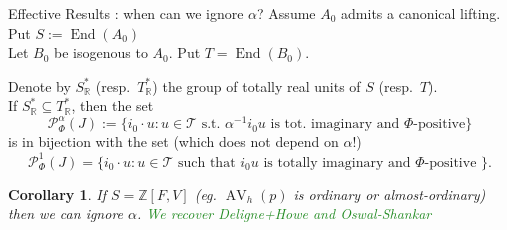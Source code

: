 \documentclass[usenames,dvipsnames,handout]{beamer}
\def\Z{\mathbb{Z}}
\def\R{\mathbb{R}}
\DeclareMathOperator{\AV}{AV}
\DeclareMathOperator{\End}{End}
\newcommand{\Palpha}[2]{\mathcal{P}^{\alpha}_{{#1}}({#2})}
\newcommand{\Pone}[2]{\mathcal{P}^{1}_{{#1}}({#2})}
\newcommand{\green}[1]{\textcolor{ForestGreen}{#1}}
\newtheorem{cor}[df]{Corollary}
\begin{document}
\begin{frame}{ Effective Results : when can we ignore $\alpha$? }
    Assume $A_0$ admits a canonical lifting. Put $S:=\End(A_0)$\\
    Let $B_0$ be isogenous to $A_0$. Put $T=\End(B_0)$.
\pause      
	\begin{theorem}[ 1 ]
		Denote by $S^*_\R$ (resp.~$T^*_\R$) the group of totally real units of $S$ (resp.~$T$).\\
\pause 
		If $S^*_\R\subseteq T^*_\R$, then the set
		\[ \Palpha{\Phi}{J}:=\{ i_0 \cdot u  : u \in \mathcal{T} \text{ s.t.~} \alpha^{-1} i_0 u \text{ is tot.~imaginary and } \Phi\text{-positive} \} \]
\pause 
	    is in bijection with the set (which does not depend on $\alpha$!)
        \[ \Pone{\Phi}{J}=\{ i_0 \cdot u: u \in \mathcal{T} \text{ such that } i_0 u \text{ is totally imaginary and $\Phi$-positive } \}. \]
	\end{theorem}
\pause 
	\begin{cor}
    If $S=\Z[F,V]$ (eg. $\AV_h(p)$ is ordinary or almost-ordinary) then we can ignore $\alpha$.
\pause 
    \green{We recover Deligne+Howe and Oswal-Shankar}
	\end{cor}
\end{frame}
\end{document}
